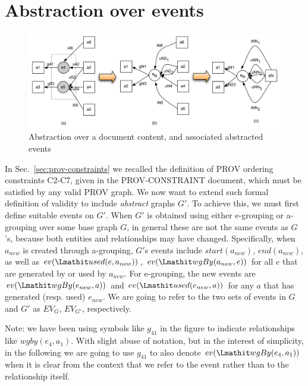 
\section{Abstraction over events}
\label{sec:event}

\begin{figure}
	\centering
	\includegraphics[scale=.5]{figures/e4-e5.pdf} 
	\caption{Abstraction over a document content, and associated abstracted events} \label{fig:e4-e5}
\end{figure}

In Sec.~\ref{sec:prov-constraints} we recalled the definition of PROV ordering  constraints C2-C7, given in the PROV-CONSTRAINT document, which must be satisfied by any valid PROV graph.
We now want to extend such formal definition of validity to include \textit{abstract} graphs $G'$. 
To achieve this, we must first define suitable events on $G'$. 
When $G'$ is obtained using either e-grouping or a-grouping over some base graph $G$,  in general these are not the same events as $G$'s, because both entities and relationships may have changed. 
Specifically, when $a_{new}$ is created through a-grouping, $G'$s events include 
 $start(a_{new})$, $end(a_{new})$, as well as 
$ev(\used(e, a_{new}))$, $ev(\wgby(a_{new}, e))$ for all $e$ that are generated by or used by $a_{new}$. 
For e-grouping, the new events are $ev(\wgby(e_{new}, a))$ and  $ev(\used(e_{new},a))$ for any $a$ that has generated (resp. used) $e_{new}$.
%
We are going to refer to the two sets of events in $G$ and $G'$ as $EV_{G}$, $EV_{G'}$, respectively.

Note: we have been using symbols like $g_{41}$ in the figure to indicate relationships like $wgby(e_4, a_1)$. 
With slight abuse of notation, but in the interest of simplicity, in the following we are going to use $g_{41}$ to also denote $ev(\wgby(e_4, a_1))$ when it is clear from the context that we refer to the event rather than to the relationship itself.

